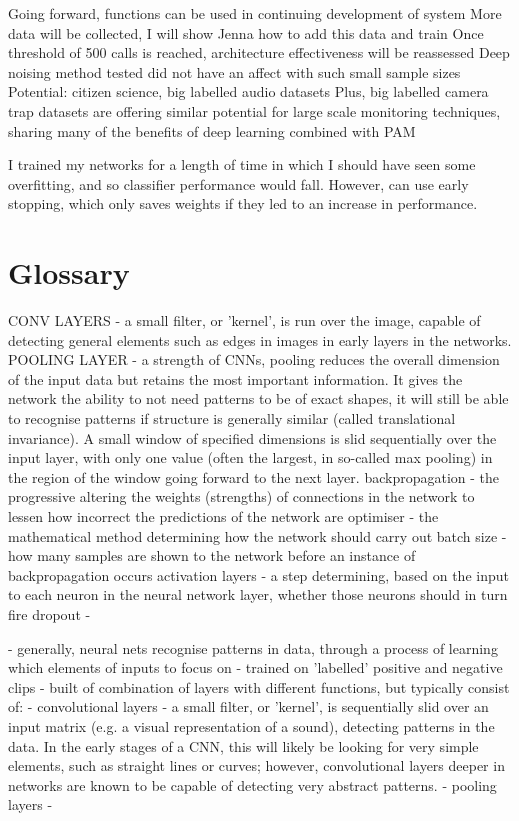 \documentclass[11pt]{article}
\begin{document}
Going forward, functions can be used in continuing development of system
More data will be collected, I will show Jenna how to add this data and train
Once threshold of 500 calls is reached, architecture effectiveness will be reassessed 
Deep noising method tested did not have an affect with such small sample sizes
Potential: citizen science, big labelled audio datasets
Plus, big labelled camera trap datasets are offering similar potential for large scale monitoring techniques, sharing many of the benefits of deep learning combined with PAM 

I trained my networks for a length of time in which I should have seen some overfitting, and so classifier performance would fall. However, can use early stopping, which only saves weights if they led to an increase in performance. 

\section{Glossary}
CONV LAYERS - a small  filter, or 'kernel', is run over the image, capable of detecting general elements such as edges in images in early layers in the networks. 
POOLING LAYER - a strength of CNNs, pooling reduces the overall dimension of the input data but retains the most important information. It gives the network the ability to not need patterns to be of exact shapes, it will still be able to recognise patterns if structure is generally similar (called translational invariance). A small window of specified dimensions is slid sequentially over the input layer, with only one value (often the largest, in so-called max pooling) in the region of the window going forward to the next layer. 
backpropagation - the progressive altering the weights (strengths) of connections in the network to lessen how incorrect the predictions of the network are
optimiser - the mathematical method determining how the network should carry out 
batch size - how many samples are shown to the network before an instance of backpropagation occurs 
activation layers - a step determining, based on the input to each neuron in the neural network layer, whether those neurons should in turn fire
dropout - 

- generally, neural nets recognise patterns in data, through a process of learning which elements of inputs to focus on
- trained on 'labelled' positive and negative clips 
- built of combination of layers with different functions, but typically consist of:
- convolutional layers - a small filter, or 'kernel', is sequentially slid over an input matrix (e.g. a visual representation of a sound), detecting patterns in the data. In the early stages of a CNN, this will likely be looking for very simple elements, such as straight lines or curves; however, convolutional layers deeper in networks are known to be capable of detecting very abstract patterns. 
- pooling layers - 
\end{document}
